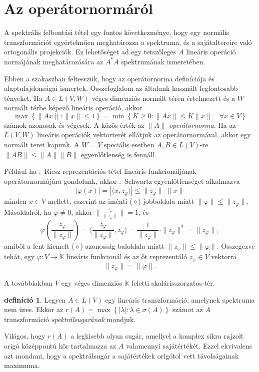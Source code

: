 \documentclass[a4paper, showtrims]{memoir}
\theoremstyle{plain}
\theoremstyle{remark}
\theoremstyle{definition}
\newtheorem{definition}[proposition]{definíció}
\newcommand{\ip}[2]{\langle#1,#2\rangle}
\begin{document}
\section{Az operátornormáról}
A spektrális felbontási tétel egy fontos következménye,
hogy egy normális transzformációt egyértelműen meghatározza a spektruma, és a sajátaltereire való
ortogonális projekciók.
Ez lehetőséget ad egy tetszőleges $A$ lineáris operáció normájának meghatározására az $A^\ast A$ spektrumának ismeretében.

Ebben a szakaszban feltesszük,
hogy az operátornorma definíciója és alaptulajdonságai ismertek.
Összefoglalom az általunk használt legfontosabb tényeket.
Ha $A\in L\left( V,W \right)$ véges dimenziós normált téren értelmezett és a $W$ normált térbe képező lineáris operáció,
akkor
\[
	\max\left\{ \|Ax\|:\|x\|\leq 1 \right\}
	=
    \min\left\{ K\geq 0:\|Ax\|\leq K\|x\|\quad\forall x\in V \right\}\tag{\diamond}
\]
számok azonosak és végesek. A közös érték az $\|A\|$ \emph{operátornorma}.
Ha az $L\left( V,W \right)$ lineáris operációk vektorterét ellátjuk az operátornormával,
akkor egy normált teret kapunk.
A $W=V$ speciális esetben $A,B\in L\left( V \right)$-re $\|AB\|\leq \|A\|\|B\|$ egyenlőtlenség is fennáll.

Például ha .~Riesz-reprezentációs tétel lineáris funkcionáljának operátornormájára gondolunk,
akkor .~Schwartz-egyenlőtlenséget alkalmazva
\[
    |\varphi\left( x \right)|
    =
    |\ip{x}{z_\varphi}|
    \leq \|z_\varphi\|\cdot\|x\|
\] 
minden $x\in V$ mellett, eszerint az iménti ($\diamond$) jobboldala miatt
\(
    \|\varphi
    \|\leq
    \|z_\varphi\|
\).
Másoldalról, ha $\varphi\neq 0$, akkor $\|\frac{z_\varphi}{\|z_\varphi\|}\|=1$,
és
\[
\varphi\left( \frac{z_\varphi}{\|z_\varphi\|} \right)
=
\ip{\frac{z_\varphi}{\|z_\varphi\|}}{z_\varphi}
=
\frac{1}{\|z_\varphi\|}\cdot\|z_\varphi\|^2
=
\|z_\varphi\|,
\]
amiből a fent kiemelt ($\diamond$) azonosság baloldala miatt 
\(
    \|z_\varphi\|
    \leq
    \|\varphi\|
\).
Összegezve tehát, 
egy $\varphi:V\to\mathbb{K}$ lineáris funkcionál és az őt reprezentáló 
$z_\varphi\in V$ vektorra
\[
    \|z_\varphi\|
    =
    \|\varphi\|.
\]

A továbbiakban $V$ egy véges dimenziós $\mathbb{K}$ feletti skalárisszorzatos-tér.
\begin{definition}
	Legyen $A\in L\left( V \right)$ egy lineáris transzformáció,
	amelynek spektruma nem üres.
	Ekkor az $r\left( A \right)=\max\left\{ |\lambda|:\lambda\in\sigma\left( A \right) \right\}$
	számot az $A$ transzformáció
	\emph{spektrálsugarának}
	mondjuk.
\end{definition}
Világos, hogy $r\left( A \right)$ a legkisebb olyan sugár,
amellyel a komplex síkra rajzolt origó középpontú kör tartalmazza az $A$ valamennyi sajátértékét.
Ezzel ekvivalens azt mondani,
hogy a spektrálsugár a sajátértékek origótol vett távolságainak maximuma.
\end{document}
